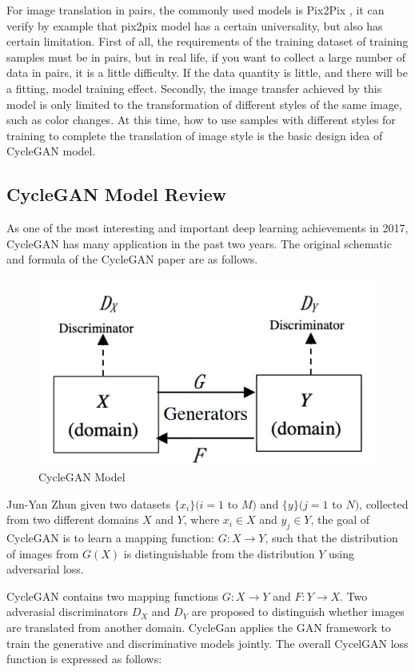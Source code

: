 \documentclass[peerreview]{IEEEtran}
\begin{document}
For image translation in pairs, the commonly used models is Pix2Pix \cite{isola2017image}, it can verify by example that pix2pix model has a certain universality, but also has certain limitation. First of all, the requirements of the training dataset of training samples must be in pairs, but in real life, if you want to collect a large number of data in pairs, it is a little diﬃculty. If the data quantity is little, and there will be a fitting, model training eﬀect. Secondly, the image transfer achieved by this model is only limited to the transformation of diﬀerent styles of the same image, such as color changes. At this time, how to use samples with diﬀerent styles for training to complete the translation of image style is the basic design idea of CycleGAN model.

\subsection{CycleGAN Model Review}
As one of the most interesting and important deep learning achievements in 2017, CycleGAN has many application in the past two years. The original schematic and formula of the CycleGAN paper are as follows.

\begin{figure}[H]
    \centering
    \includegraphics[width=0.8\columnwidth]{CycleGAN Model}
    \caption{CycleGAN Model}
    \label{fig:s=cyclegan_model}
\end{figure}

Jun-Yan Zhun \cite{zhu2017unpaired} given two datasets $\{x_i\}(i=1$ to $M)$ and $\{y\}(j=1$ to $N)$, collected from two different domains $X$ and $Y$, where $x_i \in X$ and $y_j \in Y$, the goal of CycleGAN is to learn a mapping function: $G:X \to Y$, such that the distribution of images from $G(X)$ is distinguishable from the distribution $Y$ using adversarial loss.

CycleGAN contains two mapping functions $G:X \to Y$ and $F:Y \to X$. Two adverasial discriminators $D_X$ and $D_Y$ are proposed to distinguish whether images are translated from another domain. CycleGan applies the GAN framework to train the generative and discriminative models jointly. The overall CycelGAN loss function is expressed as follows: 
\end{document}
